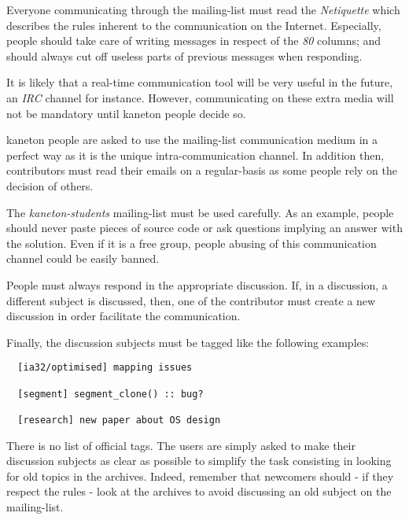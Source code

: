 Everyone communicating through the mailing-list must read the
\textit{Netiquette} which describes the rules inherent to the communication
on the Internet. Especially, people should take care of writing messages in
respect of the \textit{80} columns; and should always cut off useless parts
of previous messages when responding.

It is likely that a real-time communication tool will be very useful in the
future, an \textit{IRC} channel for instance. However, communicating on
these extra media will not be mandatory until kaneton people decide so.

kaneton people are asked to use the mailing-list communication medium
in a perfect way as it is the unique intra-communication channel. In
addition then, contributors must read their emails on a regular-basis
as some people rely on the decision of others.

The \textit{kaneton-students} mailing-list must be used carefully. As
an example, people should never paste pieces of source code or ask
questions implying an answer with the solution. Even if it is a free
group, people abusing of this communication channel could be easily banned.

People must always respond in the appropriate discussion. If, in a discussion,
a different subject is discussed, then, one of the contributor must create
a new discussion in order facilitate the communication.

Finally, the discussion subjects must be tagged like the following examples:

\begin{verbatim}
  [ia32/optimised] mapping issues

  [segment] segment_clone() :: bug?

  [research] new paper about OS design
\end{verbatim}

There is no list of official tags. The users are simply asked to make
their discussion subjects as clear as possible to simplify the task
consisting in looking for old topics in the archives. Indeed, remember
that newcomers should - if they respect the rules - look at the archives
to avoid discussing an old subject on the mailing-list.
